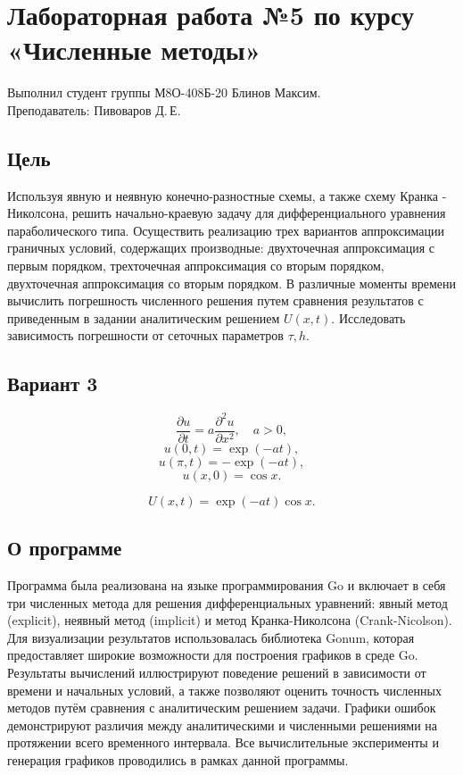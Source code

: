 \documentclass{article}
\begin{document}
\section*{Лабораторная работа №5 по курсу «Численные методы»}

Выполнил студент группы М8О-408Б-20 Блинов Максим.
\\
Преподаватель: Пивоваров Д.\,Е.

\subsection*{Цель}

Используя явную и неявную конечно-разностные схемы, а также схему 
Кранка - Николсона, решить начально-краевую задачу для дифференциального 
уравнения параболического типа. Осуществить реализацию трех вариантов 
аппроксимации граничных условий, содержащих производные: двухточечная 
аппроксимация с первым порядком, трехточечная аппроксимация со вторым порядком, 
двухточечная аппроксимация со вторым порядком. В различные моменты времени 
вычислить погрешность численного решения путем сравнения результатов с 
приведенным в задании аналитическим решением $ U(x, t) $. Исследовать 
зависимость погрешности от сеточных параметров $ \tau, h $.

\subsection*{Вариант 3}
$$ \frac{\partial u}{\partial t} = a \frac{\partial^2 u}{\partial x^2}, \quad a > 0, $$
$$ u(0, t) = \exp(- at), $$
$$ u(\pi, t) = - \exp(- at), $$
$$ u(x, 0) = \cos x. $$

 $$ U(x, t) = \exp(- at) \cos x. $$


\subsection*{О программе}

Программа была реализована на языке программирования Go и включает в себя три численных метода для решения дифференциальных уравнений: 
явный метод (explicit), неявный метод (implicit) и метод Кранка-Николсона (Crank-Nicolson). Для визуализации результатов использовалась библиотека Gonum, 
которая предоставляет широкие возможности для построения графиков в среде Go. Результаты вычислений иллюстрируют поведение решений в зависимости от времени 
и начальных условий, а также позволяют оценить точность численных методов путём сравнения с аналитическим решением задачи. 
Графики ошибок демонстрируют различия между аналитическими и численными решениями на протяжении всего временного интервала. 
Все вычислительные эксперименты и генерация графиков проводились в рамках данной программы.
\end{document}
